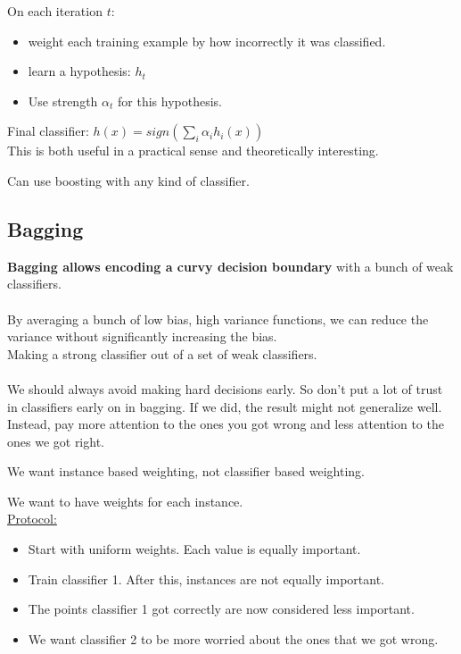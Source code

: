 On each iteration $t$:
\begin{itemize}
	\item weight each training example by how incorrectly it was classified.
	\item learn a hypothesis: $h_t$
	\item Use strength $\alpha_t$ for this hypothesis. 
\end{itemize}
Final classifier: $\displaystyle h(x) = sign \left( \sum_i \alpha_i h_i(x)  \right)$ \hfill \\
This is both useful in a practical sense and theoretically interesting. 

Can use boosting with any kind of classifier.  %

\subsection{Bagging}
\textbf{Bagging allows encoding a curvy decision boundary} with a bunch of weak classifiers. \hfill \\
 \hfill \\

By averaging a bunch of low bias, high variance functions, we can reduce the variance without significantly increasing the bias. \hfill \\

Making a strong classifier out of a set of weak classifiers. \hfill \\
\hfill \\

We should always avoid making hard decisions early.  %
So don't put a lot of trust in classifiers early on in bagging. 
If we did, the result might not generalize well.  \hfill \\

Instead, pay more attention to the ones you got wrong and less attention to the ones we got right.  %

We want instance based weighting, not classifier based weighting.  %

We want to have weights for each instance. \hfill \\  
\underline{Protocol:}  %
\begin{itemize}
	\item Start with uniform weights.  Each value is equally important. 
	\item Train classifier 1.  After this, instances are not equally important. 
	\item The points classifier 1 got correctly are now considered less important. 
	\item We want classifier 2 to be more worried about the ones that we got wrong. 
\end{itemize}

